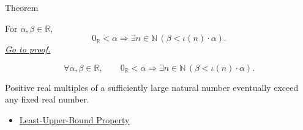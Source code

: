 \begin{theorembox}{Theorem}
\begin{theorem}
\label{thm:archimedean-property-of-r}
For $\alpha,\beta\in\mathbb{R}$,
\[
0_{\mathbb{R}}<\alpha
\Longrightarrow
\exists n\in\mathbb{N}\,(\beta<\iota(n)\cdot\alpha).
\]
\hyperref[prf:archimedean-property-of-r]{\textit{Go to proof.}}
\end{theorem}
\end{theorembox}

\begin{remark*}
\[
\forall \alpha,\beta\in\mathbb{R},\qquad
0_{\mathbb{R}}<\alpha
\Longrightarrow
\exists n\in\mathbb{N}\,(\beta<\iota(n)\cdot\alpha).
\]
\end{remark*}

\begin{remark*}[Interpretation]
Positive real multiples of a sufficiently large natural number eventually exceed any fixed real number.
\end{remark*}

\begin{dependencies}
\begin{itemize}
  \item \hyperref[thm:lub-property-r]{Least-Upper-Bound Property}
\end{itemize}
\end{dependencies}
